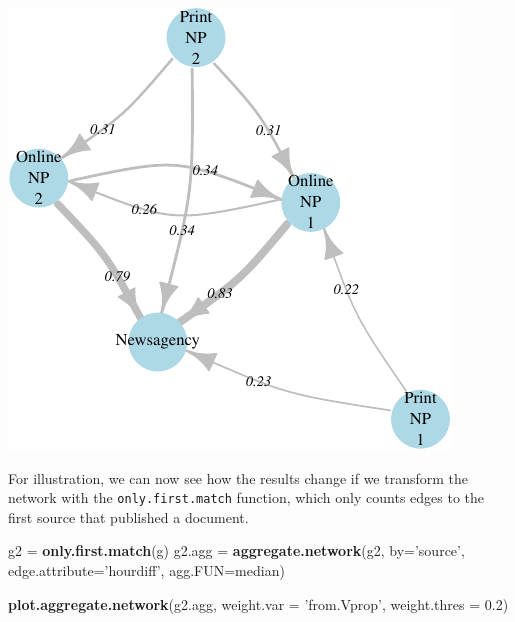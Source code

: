 \documentclass[]{article}
\newenvironment{Shaded}{\begin{snugshade}}{\end{snugshade}}
\newcommand{\KeywordTok}[1]{\textcolor[rgb]{0.13,0.29,0.53}{\textbf{{#1}}}}
\newcommand{\DataTypeTok}[1]{\textcolor[rgb]{0.13,0.29,0.53}{{#1}}}
\newcommand{\FloatTok}[1]{\textcolor[rgb]{0.00,0.00,0.81}{{#1}}}
\newcommand{\StringTok}[1]{\textcolor[rgb]{0.31,0.60,0.02}{{#1}}}
\newcommand{\NormalTok}[1]{{#1}}
\begin{document}
\begin{center}\includegraphics{vignette_files/figure-latex/unnamed-chunk-20-1} \end{center}

For illustration, we can now see how the results change if we transform
the network with the \texttt{only.first.match} function, which only
counts edges to the first source that published a document.

\begin{Shaded}
\begin{Highlighting}[]
\NormalTok{g2 =}\StringTok{ }\KeywordTok{only.first.match}\NormalTok{(g)}
\NormalTok{g2.agg =}\StringTok{ }\KeywordTok{aggregate.network}\NormalTok{(g2, }\DataTypeTok{by=}\StringTok{'source'}\NormalTok{, }\DataTypeTok{edge.attribute=}\StringTok{'hourdiff'}\NormalTok{, }\DataTypeTok{agg.FUN=}\NormalTok{median)}

\KeywordTok{plot.aggregate.network}\NormalTok{(g2.agg, }\DataTypeTok{weight.var =} \StringTok{'from.Vprop'}\NormalTok{,}
                       \DataTypeTok{weight.thres =} \FloatTok{0.2}\NormalTok{)}
\end{Highlighting}
\end{Shaded}
\end{document}
